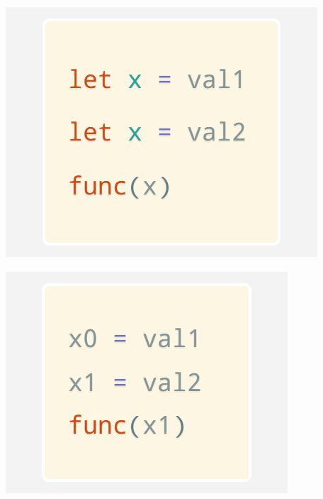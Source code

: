 \documentclass[a1,portrait]{a1poster}
\begin{document}
\begin{multicols}{2}
\begin{multicols}{3}

\begin{minipage}[b]{1\linewidth}
\begin{center}\vspace{1cm}
\includegraphics[width=0.9\linewidth]{figs/let.png}
\end{center}\vspace{1cm}
\end{minipage}

\begin{minipage}[b]{1\linewidth}
\begin{center}\vspace{1cm}
\includegraphics[width=0.9\linewidth]{figs/let-by-mangling.png}
\end{center}\vspace{1cm}
\end{minipage}



\end{multicols}
\end{multicols}
\end{document}
